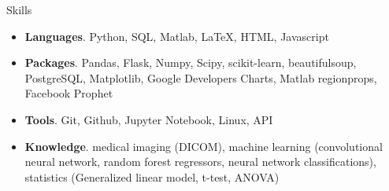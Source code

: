\documentclass{resume} %
\begin{document}

\begin{rSection}{Skills}
	\begin{itemize}[leftmargin=0em]
		\item {\bf Languages}{. Python, SQL, Matlab, LaTeX, HTML, Javascript}
		\item {\bf Packages}{. Pandas, Flask, Numpy, Scipy, scikit-learn, beautifulsoup, PostgreSQL, Matplotlib, Google Developers Charts, Matlab regionprops, Facebook Prophet}
		\item {\bf Tools}{. Git, Github, Jupyter Notebook, Linux, API}
		\item {\bf Knowledge}{. medical imaging (DICOM), machine learning (convolutional neural network, random forest regressors, neural network classifications), statistics (Generalized linear model, t-test, ANOVA)}
		
	\end{itemize}
\end{rSection}
\end{document}
